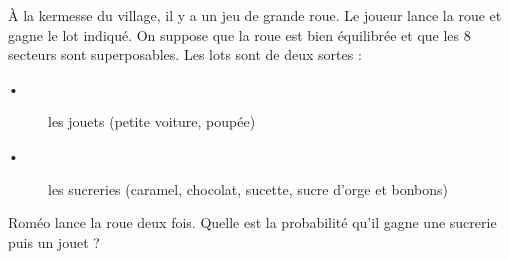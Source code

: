 
À la kermesse du village, il y a un jeu de grande roue. Le joueur lance la roue et gagne le lot indiqué.
On suppose que la roue est bien équilibrée et que les 8 secteurs sont superposables.
Les lots sont de deux sortes : 
\begin{description}
\item[•] les jouets (petite voiture, poupée)
\item[•] les sucreries (caramel, chocolat, sucette, sucre d'orge et bonbons)
\end{description}

Roméo lance la roue deux fois. Quelle  est  la  probabilité  qu'il gagne une sucrerie puis un jouet ?